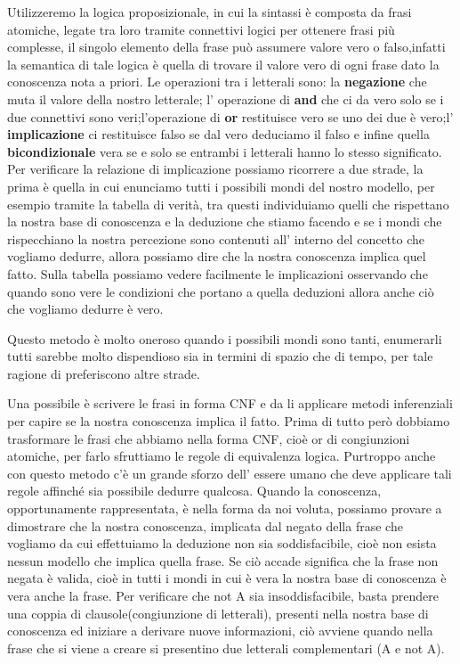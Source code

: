 		Utilizzeremo la logica proposizionale, in cui la sintassi è composta da frasi atomiche, legate tra loro tramite connettivi logici per ottenere frasi più complesse, il singolo elemento della frase può assumere valore vero o falso,infatti la semantica di tale logica è quella di trovare il valore vero di ogni frase dato la conoscenza nota a priori. Le operazioni tra i letterali sono: la \textbf{negazione} che muta il valore della nostro letterale; l' operazione di \textbf{and} che ci da vero solo se i due connettivi sono veri;l'operazione di \textbf{or} restituisce vero se uno dei due è vero;l' \textbf{implicazione} ci restituisce falso se dal vero deduciamo il falso e infine quella \textbf{bicondizionale} vera se e solo se entrambi i letterali hanno lo stesso significato.
		Per verificare la relazione di implicazione possiamo ricorrere a due strade, la prima è quella in cui enunciamo tutti i possibili mondi del nostro modello, per esempio tramite la tabella di verità, tra questi individuiamo quelli che rispettano la nostra base di conoscenza e la deduzione che stiamo facendo e se i mondi che rispecchiano la nostra percezione sono contenuti all' interno del concetto che vogliamo dedurre, allora possiamo dire che la nostra conoscenza implica quel fatto.
		Sulla tabella possiamo vedere facilmente le implicazioni osservando che quando sono vere le condizioni che portano a quella deduzioni allora anche ciò che vogliamo dedurre è vero.
		\par
		Questo metodo è molto oneroso quando i possibili mondi sono tanti, enumerarli tutti sarebbe molto dispendioso sia in termini di spazio che di tempo, per tale ragione di preferiscono altre strade.
		\par
		Una possibile è scrivere le frasi in forma CNF e da li applicare metodi inferenziali per capire se la nostra conoscenza implica il fatto. 
		Prima di tutto però dobbiamo trasformare le frasi che abbiamo nella forma CNF, cioè or di congiunzioni atomiche, per farlo sfruttiamo le regole di equivalenza logica. Purtroppo anche con questo metodo c'è un grande sforzo dell' essere umano che deve applicare tali regole affinché sia possibile dedurre qualcosa.
		Quando la conoscenza, opportunamente rappresentata, è nella forma da noi voluta, possiamo provare a dimostrare che la nostra conoscenza, implicata dal negato della frase che vogliamo da cui effettuiamo la deduzione non sia soddisfacibile, cioè non esista nessun modello che implica quella frase. Se ciò accade significa che la frase non negata è valida, cioè in tutti i mondi in cui è vera la nostra base di conoscenza è vera anche la frase. Per verificare che not A sia insoddisfacibile, basta prendere una coppia di clausole(congiunzione di letterali), presenti nella nostra base di conoscenza ed iniziare a derivare nuove informazioni, ciò avviene quando nella frase che si viene a creare si presentino due letterali complementari (A e not A).
